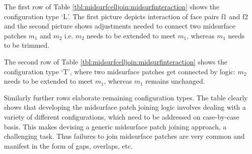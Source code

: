 The first row of Table \ref{tbl:midsurfcelljoin:midsurfinteraction} shows the configuration type `L'. The first picture depicts interaction of face pairs f1 and f2 and the second picture shows adjustments needed to connect two midsurface patches $m_1$ and $m_2$ i.e. $m_2$ needs to be extended to meet $m_1$, whereas $m_1$ needs to be trimmed.

The second row of Table \ref{tbl:midsurfcelljoin:midsurfinteraction} shows the configuration type `T', where two midsurface patches get connected by logic: $m_2$ needs to be extended to meet $m_1$, whereas $m_1$ remains unchanged.

Similarly further rows elaborate remaining configuration types. The table clearly shows that developing the midsurface patch joining logic involves dealing with a variety of different configurations, which need to be addressed on case-by-case basis. This makes devising a generic midsurface patch joining approach, a challenging task.  Thus failures to join midsurface patches are very common and manifest in the form of gaps, overlaps, etc.





 


